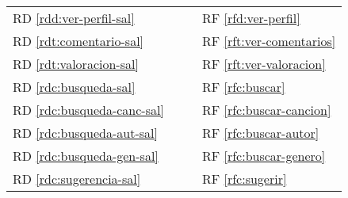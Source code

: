 \documentclass[
  12pt,
  a4paper,
  DIV=12,
  spanish,
]{scrartcl}
\newcounter{RF}
\newcounter{RD}
\begin{document}
\begin{tabularx}{\linewidth}{l|XXX}
  RD \ref{rdd:ver-perfil-sal} & & & RF \ref{rfd:ver-perfil} \\
  RD \ref{rdt:comentario-sal} & & & RF \ref{rft:ver-comentarios} \\
  RD \ref{rdt:valoracion-sal} & & & RF \ref{rft:ver-valoracion} \\
  RD \ref{rdc:busqueda-sal} & & & RF \ref{rfc:buscar} \\
  RD \ref{rdc:busqueda-canc-sal} & & & RF \ref{rfc:buscar-cancion} \\
  RD \ref{rdc:busqueda-aut-sal} & & & RF \ref{rfc:buscar-autor} \\
  RD \ref{rdc:busqueda-gen-sal} & & & RF \ref{rfc:buscar-genero} \\
  RD \ref{rdc:sugerencia-sal} & & & RF \ref{rfc:sugerir} \\

\end{tabularx}

\end{document}
